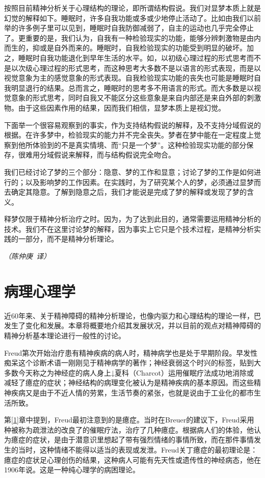 \documentclass[UTF8,10pt,a4paper,openany]{book}
\newcommand{\signature}[1]{\begin{flushright}\slshape #1\end{flushright}}
\newcommand{\signatureA}{\signature{（陈仲庚~译）}}
\begin{document}
按照目前精神分析关于心理结构的理论，即所谓结构假说。我们对显梦本质上就是幻觉的解释如下。睡眠时，许多自我功能或多或少地停止活动了。比如由我们以前举的许多例子里可以见到，睡眠时自我防御减弱了，自主的运动也几乎完全停止了。更重要的是，我们认为，自我有一种检验现实的功能，能够分辨刺激物是由内而生的，抑或是自外而来的。睡眠时，自我检验现实的功能受到明显的破坏。加之，睡眠时自我功能退化到早年生活的水平。如，以初级心理过程的形式思考而不是以次级心理过程的形式思考，而这种思考大多数不是以语言的形式表现，而是以视觉意象为主的感觉意象的形式表现。自我检验现实功能的丧失也可能是睡眠时自我明显退行的结果。总而言之，睡眠时的思考多不用语言的形式。而大多数是以视觉意象的形式思考，同时自我又不能区分这些意象是来自内部还是来自外部的刺激物。由于这些因素作用的结果，因而我们相信，显梦本质上是视幻觉。

下面举一个很容易观察到的事实，作为支持结构假说的解释，及不支持分域假说的根据。在许多梦中，检验现实的能力并不完全丧失。梦者在梦中能在一定程度上觉察到他所体验到的不是真实情境、而“只是一个梦”。这种检验现实功能的部分保存，很难用分域假说来解释，而与结构假说完全吻合。

我们已经讨论了梦的三个部分：隐意、梦的工作和显意；讨论了梦的工作是如何进行的；以及影响梦的工作因素。在实践时，为了研究某个人的梦，必须通过显梦而去确定其隐意。了解到隐意之后，我们才能说是完成了梦的解释或发现了梦的含义。

释梦仅限于精神分析治疗之时。因为，为了达到此目的，通常需要运用精神分析的技术。我们不在这里讨论梦的解释，因为事实上它只是个技术过程，是精神分析实践的一部分，而不是精神分析理论。

\signatureA



\chapter{病理心理学}\label{8}

近60年来、关于精神障碍的精神分析理论，也像内驱力和心理结构的理论一样，巴发生了变化和发展。本章将概要地介绍其发展状况，并以目前的观点对精神障碍的精神分析基本理论进行一般性的讨论。

Freud第次开始治疗患有精神疾病的病人时，精神病学也是处于早期阶段。早发性痴呆这个诊断术语一刚刚见于精神病学的著作；神经衰弱这个时兴的标签，贴到大多数今天称之为神经症的病人身上↓夏科（Charcot）运用催眠疗法成功地消除或减轻了癔症的症状；神经结构的病理变化被认为是精神疾病的基本原因。而这些精神疾病又是由于不近人情的劳累，生活节奏的紧张，也就是说由于工业化的都市生活所致。

第\ref{1}章中提到，Freud最初注意到的是癔症。当时在Breuer的建议下，Freud采用种被称为疏泄法的改良了的催眠疗法，治疗了几种癔症。根据病人们的体验，他认为癔症的症状，是由于潜意识里想起了带有强烈情绪的事情所致，而在那件事情发生的当时，这种情绪不能得以适当的表现或发泄。Freud关丁癔症的最初理论是：癔症的症状足心理创伤的结果，这种病人可能有先天性或遗传性的神经病态，他在1906年说。这是一种纯心理学的病困理论。
\end{document}
